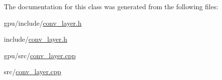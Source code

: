 \-The documentation for this class was generated from the following files\-:\begin{DoxyCompactItemize}
\item 
gpu/include/\hyperlink{gpu_2include_2conv__layer_8h}{conv\-\_\-layer.\-h}\item 
include/\hyperlink{include_2conv__layer_8h}{conv\-\_\-layer.\-h}\item 
gpu/src/\hyperlink{gpu_2src_2conv__layer_8cpp}{conv\-\_\-layer.\-cpp}\item 
src/\hyperlink{src_2conv__layer_8cpp}{conv\-\_\-layer.\-cpp}\end{DoxyCompactItemize}
